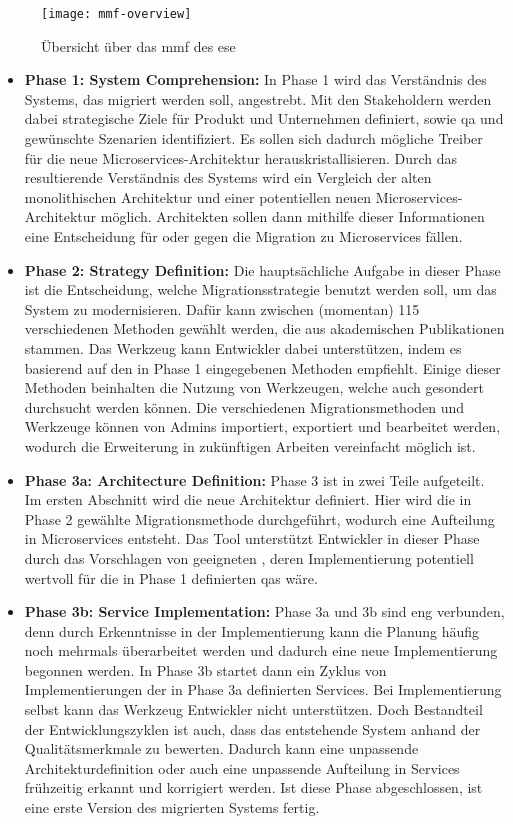 \begin{figure}
	\centering
	\texttt{[image: mmf-overview]}
	\caption[\acrfull{mmf} Übersicht]{
		Übersicht über das \gls{mmf} des \gls{ese}
	}
	\label{fig:expert-material-mmf-overview}
\end{figure}

\begin{itemize}
	\item \textbf{Phase 1: System Comprehension:}
	In Phase 1 wird das Verständnis des Systems, das migriert werden soll, angestrebt.
	Mit den Stakeholdern werden dabei strategische Ziele für Produkt und Unternehmen definiert, sowie \acrfull{qa} und gewünschte Szenarien identifiziert.
	Es sollen sich dadurch mögliche Treiber für die neue Microservices-Architektur herauskristallisieren.
	Durch das resultierende Verständnis des Systems wird ein Vergleich der alten monolithischen Architektur und einer potentiellen neuen Microservices-Architektur möglich.
	Architekten sollen dann mithilfe dieser Informationen eine Entscheidung für oder gegen die Migration zu Microservices fällen.
	\item \textbf{Phase 2: Strategy Definition:}
	Die hauptsächliche Aufgabe in dieser Phase ist die Entscheidung, welche Migrationsstrategie benutzt werden soll, um das System zu modernisieren.
	Dafür kann zwischen (momentan) 115 verschiedenen Methoden gewählt werden, die aus akademischen Publikationen stammen.
	Das Werkzeug kann Entwickler dabei unterstützen, indem es basierend auf den in Phase 1 eingegebenen  Methoden empfiehlt.
	Einige dieser Methoden beinhalten die Nutzung von Werkzeugen, welche auch gesondert durchsucht werden können.
	Die verschiedenen Migrationsmethoden und Werkzeuge können von Admins importiert, exportiert und bearbeitet werden, wodurch die Erweiterung in zukünftigen Arbeiten vereinfacht möglich ist.
	\item \textbf{Phase 3a: Architecture Definition:}
	Phase 3 ist in zwei Teile aufgeteilt.
	Im ersten Abschnitt wird die neue Architektur definiert.
	Hier wird die in Phase 2 gewählte Migrationsmethode durchgeführt, wodurch eine Aufteilung in Microservices entsteht.
	Das Tool unterstützt Entwickler in dieser Phase durch das Vorschlagen von geeigneten \bpp, deren Implementierung potentiell wertvoll für die in Phase 1 definierten \glspl{qa} wäre.
	\item \textbf{Phase 3b: Service Implementation:} 
	Phase 3a und 3b sind eng verbunden, denn durch Erkenntnisse in der Implementierung kann die Planung häufig noch mehrmals überarbeitet werden und dadurch eine neue Implementierung begonnen werden.
	In Phase 3b startet dann ein Zyklus von Im\-ple\-men\-tie\-rung\-en der in Phase 3a definierten Services.
	Bei Implementierung selbst kann das Werkzeug Entwickler nicht unterstützen.
	Doch Bestandteil der Entwicklungszyklen ist auch, dass das entstehende System anhand der Qualitätsmerkmale zu bewerten.
	Dadurch kann eine unpassende Architekturdefinition oder auch eine unpassende Aufteilung in Services frühzeitig erkannt und korrigiert werden.
	Ist diese Phase abgeschlossen, ist eine erste Version des migrierten Systems fertig.
\end{itemize}

